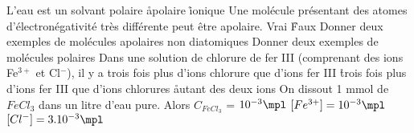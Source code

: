 \q
L'eau est un solvant
\rv
polaire
\r
apolaire
\r
ionique
\q
Une molécule présentant des atomes d'électronégativité très différente peut être apolaire.
\rv
Vrai
\r
Faux
\q
Donner deux exemples de molécules apolaires non diatomiques
\q
Donner deux exemples de molécules polaires
\q
Dans une solution de chlorure de fer III (comprenant des ions Fe$^{3+}$ et Cl$^-$), il y a
\rv
trois fois plus d'ions chlorure que d'ions fer III
\r
trois fois plus d'ions fer III que d'ions chlorures
\r
autant des deux ions
\q
On dissout 1 mmol de $FeCl_3$ dans un litre d'eau pure. Alors
\rv
$C_{FeCl_3}$ = $10^{-3} \mpl$
\rv
$[Fe^{3+}] = 10^{-3} \mpl$
\rv
$[Cl^{-}] = 3.10^{-3} \mpl$

